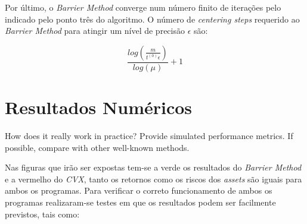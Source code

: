 \documentclass[a4paper]{IEEEtran}
\begin{document}
Por último, o \textit{Barrier Method} converge num número finito de iterações pelo indicado pelo ponto três do algoritmo. O número de \textit{centering steps} requerido ao \textit{Barrier Method} para atingir um nível de precisão $\epsilon$ são:

\begin{equation}
\label{steps}
\frac{log(\frac{m}{t^{(0)}\epsilon})}{log(\mu)} + 1
\end{equation}

\section{Resultados Numéricos}
\label{sec:numerical-results}

How does it really work in practice? Provide simulated performance
metrics. If possible, compare with other well-known methods.

Nas figuras que irão ser expostas tem-se a verde os resultados do \textit{Barrier Method} e a vermelho do \textit{CVX}, tanto os retornos como os riscos dos \textit{assets} são iguais para ambos os programas.
Para verificar o correto funcionamento de ambos os programas realizaram-se testes em que os resultados podem ser facilmente previstos, tais como:
\end{document}
